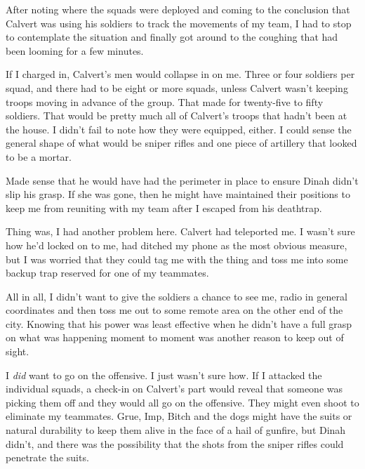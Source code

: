 After noting where the squads were deployed and coming to the conclusion that Calvert was using his soldiers to track the movements of my team, I had to stop to contemplate the situation and finally got around to the coughing that had been looming for a few minutes.



If I charged in, Calvert's men would collapse in on me.  Three or four soldiers per squad, and there had to be eight or more squads, unless Calvert wasn't keeping troops moving in advance of the group.  That made for twenty-five to fifty soldiers.  That would be pretty much all of Calvert's troops that hadn't been at the house.  I didn't fail to note how they were equipped, either.  I could sense the general shape of what would be sniper rifles and one piece of artillery that looked to be a mortar.



Made sense that he would have had the perimeter in place to ensure Dinah didn't slip his grasp.  If she was gone, then he might have maintained their positions to keep me from reuniting with my team after I escaped from his deathtrap.



Thing was, I had another problem here.  Calvert had teleported me.  I wasn't sure how he'd locked on to me, had ditched my phone as the most obvious measure, but I was worried that they could tag me with the thing and toss me into some backup trap reserved for one of my teammates.



All in all, I didn't want to give the soldiers a chance to see me, radio in general coordinates and then toss me out to some remote area on the other end of the city.  Knowing that his power was least effective when he didn't have a full grasp on what was happening moment to moment was another reason to keep out of sight.



I \emph{did} want to go on the offensive.  I just wasn't sure how.  If I attacked the individual squads, a check-in on Calvert's part would reveal that someone was picking them off and they would all go on the offensive.  They might even shoot to eliminate my teammates.  Grue, Imp, Bitch and the dogs might have the suits or natural durability to keep them alive in the face of a hail of gunfire, but Dinah didn't, and there was the possibility that the shots from the sniper rifles could penetrate the suits.



